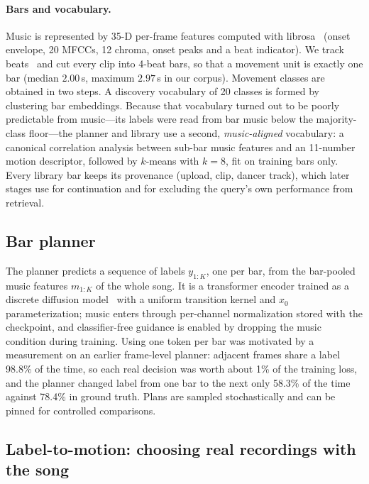 \documentclass[10pt]{article}
\begin{document}
\paragraph{Bars and vocabulary.}
Music is represented by 35-D per-frame features computed with librosa~\cite{mcfee2015librosa} (onset envelope, 20 MFCCs, 12 chroma, onset peaks and a beat indicator).
We track beats~\cite{ellis2007beat} and cut every clip into 4-beat bars, so that a movement unit is exactly one bar (median $2.00$\,s, maximum $2.97$\,s in our corpus).
Movement classes are obtained in two steps.
A discovery vocabulary of 20 classes is formed by clustering bar embeddings.
Because that vocabulary turned out to be poorly predictable from music---its labels were read from bar music below the majority-class floor---the planner and library use a second, \emph{music-aligned} vocabulary: a canonical correlation analysis between sub-bar music features and an 11-number motion descriptor, followed by $k$-means with $k{=}8$, fit on training bars only.
Every library bar keeps its provenance (upload, clip, dancer track), which later stages use for continuation and for excluding the query's own performance from retrieval.

\subsection{Bar planner}
\label{sec:planner}

The planner predicts a sequence of labels $y_{1:K}$, one per bar, from the bar-pooled music features $m_{1:K}$ of the whole song.
It is a transformer encoder trained as a discrete diffusion model~\cite{austin2021d3pm} with a uniform transition kernel and $x_0$ parameterization; music enters through per-channel normalization stored with the checkpoint, and classifier-free guidance is enabled by dropping the music condition during training.
Using one token per bar was motivated by a measurement on an earlier frame-level planner: adjacent frames share a label 98.8\% of the time, so each real decision was worth about 1\% of the training loss, and the planner changed label from one bar to the next only 58.3\% of the time against 78.4\% in ground truth.
Plans are sampled stochastically and can be pinned for controlled comparisons.

\subsection{Label-to-motion: choosing real recordings with the song}
\label{sec:retrieval}
\end{document}
